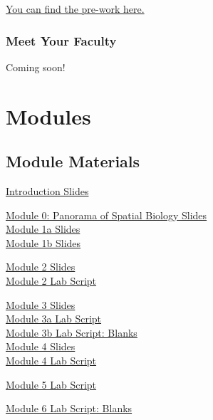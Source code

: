 \documentclass[
]{book}
\begin{document}
\href{https://docs.google.com/forms/d/e/1FAIpQLSeT3dlar3GpewcRe4Yjn5_Do0mR37brQ9eKeWmi2904_Q1AEw/viewform?usp=sf_link}{You can find the pre-work here.}

\hypertarget{meet-your-faculty}{%
\section{Meet Your Faculty}\label{meet-your-faculty}}

Coming soon!

\hypertarget{part-modules}{%
\part{Modules}\label{part-modules}}

\hypertarget{module-materials}{%
\chapter{Module Materials}\label{module-materials}}

\href{https://drive.google.com/file/d/1L0QxUN6YaxNonUczVfyQBeJ4-MWImSc7/view?usp=drive_link}{Introduction Slides}

\href{https://drive.google.com/file/d/1t4Z5u5fH88hJtrOAU6dHRmmnHvMF_LJF/view?usp=sharing}{Module 0: Panorama of Spatial Biology Slides}\\
\href{https://drive.google.com/file/d/1nr1rJdjv05NfZzsp0gYgUITMqX9g_YS_/view?usp=drive_link}{Module 1a Slides}\\
\href{https://drive.google.com/file/d/1B5CHM_i0i16G2MN8nRQLDdOtkq1K3ZKM/view?usp=drive_link}{Module 1b Slides}

\href{https://drive.google.com/file/d/1faXyFrfshZ-IyUOo7IYaj2YJI3Y0e8LF/view?usp=drive_link}{Module 2 Slides}\\
\href{https://drive.google.com/file/d/1b0klCLUidn7wMf9DmHmQ4W9uITMzAF_U/view?usp=drive_link}{Module 2 Lab Script}

\href{https://drive.google.com/file/d/1F6a8Sksim1tTmIXN6OXEKNIwN23yC5Kd/view?usp=drive_link}{Module 3 Slides}\\
\href{https://drive.google.com/file/d/1eluCP0JR7BhnJPMDiYn5mtWYWuaugflt/view?usp=drive_link}{Module 3a Lab Script}\\
\href{https://drive.google.com/file/d/1bPR5ja8SqT9tvpdiFCjLv1CoOBHbJLnw/view?usp=drive_link}{Module 3b Lab Script: Blanks}\\

\href{https://drive.google.com/file/d/1RM-NuEzzlGALL1HS4rc5DvxDsGWivOAa/view?usp=drive_link}{Module 4 Slides}\\
\href{https://drive.google.com/file/d/1aNyIe9fYdDB8rFZQcTs6UGcjO93zzixg/view?usp=drive_link}{Module 4 Lab Script}

\href{https://drive.google.com/file/d/1H8MeYzWk9ZtamZLplQdZCibEmogf0sGg/view?usp=drive_link}{Module 5 Lab Script}

\href{https://drive.google.com/file/d/1k3_Bg0q6qWkUD44QNy4uRsTpxuOlNFlx/view?usp=drive_link}{Module 6 Lab Script: Blanks}\\

  
\end{document}
